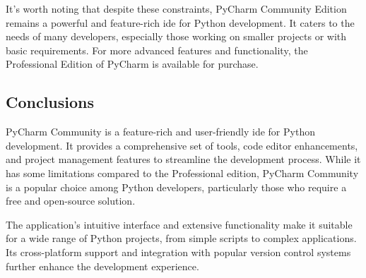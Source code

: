 It's worth noting that despite these constraints, PyCharm Community Edition remains a powerful and feature-rich \ac{ide} for Python development. It caters to the needs of many developers, especially those working on smaller projects or with basic requirements. For more advanced features and functionality, the Professional Edition of PyCharm is available for purchase.

\subsection{Conclusions}

PyCharm Community is a feature-rich and user-friendly \ac{ide} for Python development. It provides a comprehensive set of tools, code editor enhancements, and project management features to streamline the development process. While it has some limitations compared to the Professional edition, PyCharm Community is a popular choice among Python developers, particularly those who require a free and open-source solution.

The application's intuitive interface and extensive functionality make it suitable for a wide range of Python projects, from simple scripts to complex applications. Its cross-platform support and integration with popular version control systems further enhance the development experience.

